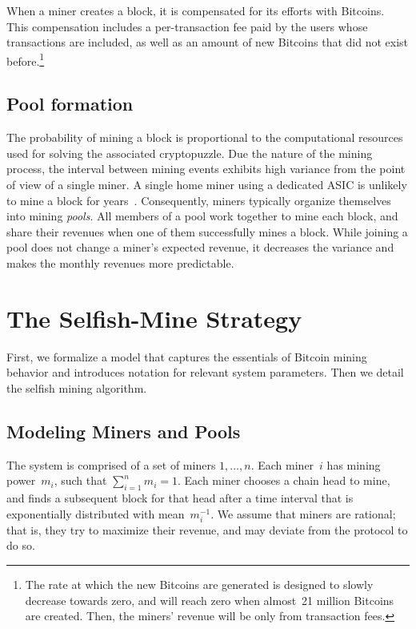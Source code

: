 \documentclass[letterpaper]{llncs}
\newcommand{\negspace}{\vspace{-0.5\baselineskip}}
\begin{document}
When a miner creates a block, it is compensated for its efforts with Bitcoins. This compensation includes a per-transaction fee paid by the users whose transactions are included, as well as an amount of new Bitcoins that did not exist before.\footnote{The rate at which the new Bitcoins are generated is designed to slowly decrease towards zero, and will reach zero when almost~21 million Bitcoins are created. Then, the miners' revenue will be only from transaction fees. }

        \subsection{Pool formation} 
\negspace
        
The probability of mining a block is proportional to the computational resources used for solving the associated cryptopuzzle.
Due the nature of the mining process, the interval between mining events exhibits high variance from the point of view of a single miner. 
A single home miner using a dedicated ASIC is unlikely to mine a block for years~\cite{swanson2013calculator}. 
Consequently, miners typically organize themselves into mining \emph{pools}. 
All members of a pool work together to mine each block, and share their revenues when one of them successfully mines a block. 
While joining a pool does not change a miner's expected revenue, it decreases the variance and makes the monthly revenues more predictable. 



    \section{The Selfish-Mine Strategy} \label{sec:algo}

First, we formalize a model that captures the essentials of Bitcoin mining behavior and introduces notation for relevant system parameters. Then we detail the selfish mining algorithm. 

        \subsection{Modeling Miners and Pools} 

The system is comprised of a set of miners $1, \dots, n$. Each miner~$i$ has mining power~$m_i$, such that $\sum_{i=1}^n m_i = 1$. Each miner chooses a chain head to mine, and finds a subsequent block for that head after a time interval that is exponentially distributed with mean~$m_i^{-1}$. We assume that miners are rational; that is, they try to maximize their revenue, and may deviate from the protocol to do so. 
\end{document}
